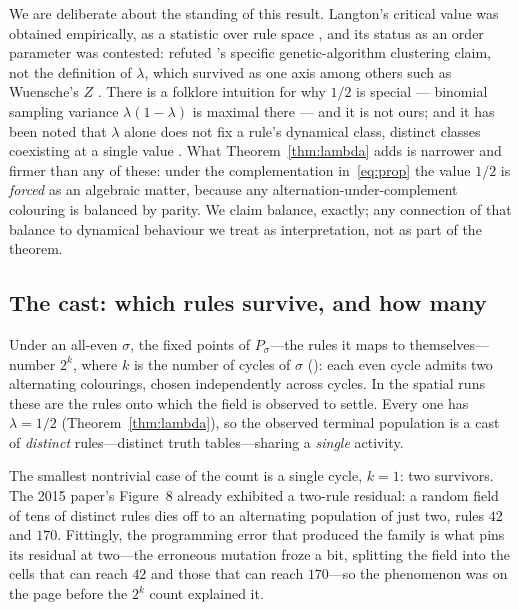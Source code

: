 \documentclass[man,12pt,floatsintext,donotrepeattitle]{apa7}
\newcommand{\sig}{\sigma}
\newcommand{\secref}[1]{\emph{\nameref{#1}}}
\begin{document}
We are deliberate about the standing of this result. Langton's critical
value was obtained empirically, as a statistic over rule space
\parencite{langton1990computation}, and its status as an order parameter
was contested: \textcite{mitchell1993revisiting} refuted
\textcite{packard1988adaptation}'s specific genetic-algorithm clustering
claim, not the definition of $\lambda$, which survived as one axis among
others such as Wuensche's $Z$ \parencite{wuensche1999classifying}. There is
a folklore intuition for why $1/2$ is special --- binomial sampling variance
$\lambda(1-\lambda)$ is maximal there --- and it is not ours; and it has been
noted that $\lambda$ alone does not fix a rule's dynamical class, distinct
classes coexisting at a single value \parencite{sakai2002edge}. What
Theorem~\ref{thm:lambda} adds is narrower and firmer than any of these: under
the complementation in~\eqref{eq:prop} the value $1/2$ is \emph{forced} as an
algebraic matter, because any alternation-under-complement colouring is
balanced by parity. We claim balance, exactly; any connection of that
balance to dynamical behaviour we treat as interpretation, not as part of the
theorem.

\subsection{The cast: which rules survive, and how many}

Under an all-even $\sig$, the fixed points of $P_\sig$---the rules it maps to
themselves---number $2^k$, where $k$ is the number of cycles of $\sig$
(\secref{sec:classification}): each even cycle admits two alternating
colourings, chosen independently across cycles. In the spatial runs these are
the rules onto which the field is observed to settle. Every one has
$\lambda = 1/2$ (Theorem~\ref{thm:lambda}), so the observed terminal
population is a cast of \emph{distinct} rules---distinct truth tables---sharing
a \emph{single} activity.

The smallest nontrivial case of the count is a single cycle, $k = 1$: two
survivors. The 2015 paper's Figure~8 already exhibited a two-rule residual: a
random field of tens of distinct rules dies off to an alternating population of
just two, rules $42$ and $170$.
Fittingly, the programming error that produced the family is what pins its
residual at two---the erroneous mutation froze a bit, splitting the field
into the cells that can reach $42$ and those that can reach $170$---so the
phenomenon was on the page before the $2^k$ count explained it.
\end{document}
